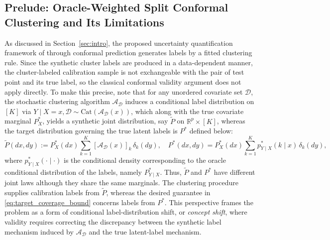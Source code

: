 \documentclass[11pt,letterpaper]{article}
\theoremstyle{definition}
\newcommand{\R}{\mathbb{R}}
\begin{document}
\subsection{Prelude: Oracle-Weighted Split Conformal Clustering and Its Limitations}
As discussed in Section~\ref{sec:intro}, the proposed uncertainty quantification framework of \cite{hur2026inference} through conformal prediction generates labels by a fitted clustering rule. Since the synthetic cluster labels are produced in a data-dependent manner, the cluster-labeled calibration sample is not exchangeable with the pair of test point and its true label, so the classical conformal validity argument does not apply directly. To make this precise, note that for any unordered covariate set \(\mathcal D\), the stochastic clustering algorithm \(\mathcal A_{\mathcal D}\) induces a conditional label distribution on \([K]\) via $Y \mid X=x,\mathcal D \sim \mathrm{Cat}(\mathcal A_{\mathcal D}(x))$, which along with the true covariate marginal \(P_X^\ast\), yields a synthetic joint distribution, say $\tilde P$ on \(\R^p \times [K]\), whereas the target distribution governing the true latent labels is $P^\ast$ defined below: 
\begin{equation*}
    \tilde P(dx,dy) := P_X^\ast(dx)\sum_{k=1}^K [\mathcal A_{\mathcal D}(x)]_k\,\delta_k(dy), \quad P^\ast(dx,dy) = P_X^\ast(dx)\sum_{k=1}^K p_{Y\mid X}^\ast(k\mid x)\,\delta_k(dy),
\end{equation*}
where $p_{Y\mid X}^\ast (\cdot\mid\cdot)$ is the conditional density corresponding to the oracle conditional distribution of the labels, namely $P_{Y\mid X}^\ast$. Thus, \(\tilde P\) and \(P^\ast\) have different joint laws although they share the same marginals. The clustering procedure supplies calibration labels from \(\tilde P\), whereas the desired guarantee in \eqref{eq:target_coverage_bound} concerns labels from \(P^\ast\). This perspective frames the problem as a form of conditional label-distribution shift, or \textit{concept shift}, where validity requires correcting the discrepancy between the synthetic label mechanism induced by \(\mathcal A_{\mathcal D}\) and the true latent-label mechanism.
\end{document}
